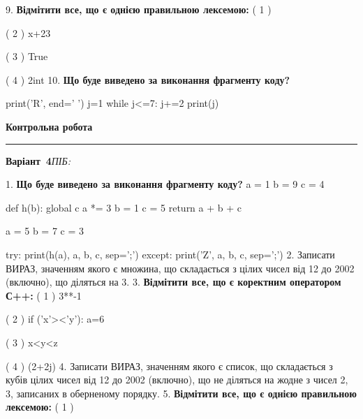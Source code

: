 \documentclass[11pt]{article}
\begin{document}
\vspace{5mm}
9. %
\textbf{Відмітити все, що є однією правильною лексемою:}
( 1 ) %

( 2 ) x+23

( 3 ) True

( 4 ) 2int
\vspace{5mm}
10. \textbf{Що буде виведено за виконання фрагменту коду?}

print('R', end=' ')
j=1
while j<=7:
    j+=2
print(j)

\vspace{5mm}










\newpage

\newpage

{\centering\Large\bfseries Контрольна робота\par}
\medskip
\noindent\rule{\linewidth}{0.5pt}
\smallskip
\noindent\textbf{Варіант \No\,4}\hfill \textit{ПІБ:}\,\underline{\hspace{60mm}}
\vspace{4mm}

1. \textbf{Що буде виведено за виконання фрагменту коду?}
a = 1
b = 9
c = 4

def h(b):
global c    a *= 3
    b = 1
    c = 5
    return a + b + c

a = 5
b = 7
c = 3

try:
    print(h(a), a, b, c, sep=';')
except:
    print('Z', a, b, c, sep=';')
\vspace{5mm}
2. 
Записати ВИРАЗ, значенням якого є множина, що складається з цілих чисел від 12 до 2002 (включно), що діляться на 3.\vspace{5mm}
3. %
\textbf{Відмітити все, що є коректним оператором С++:}
( 1 ) 3**-1

( 2 ) if ('x'><'y'): a=6

( 3 ) x<y<z

( 4 ) (2+2j)%
\vspace{5mm}
4. 
Записати ВИРАЗ, значенням якого є список, що складається з кубів цілих чисел від 12 до 2002 (включно), що не діляться на жодне з чисел 2, 3, записаних в оберненому порядку.\vspace{5mm}
5. %
\textbf{Відмітити все, що є однією правильною лексемою:}
( 1 ) %
\end{document}
